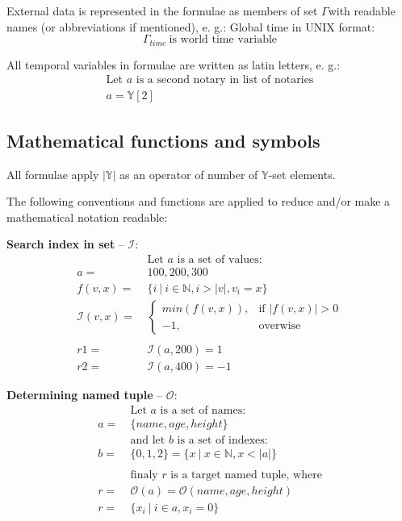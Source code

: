 \documentclass[12pt]{report}
\newcommand{\hlc}[1]{\colorbox{yellow!25}{#1}}
\begin{document}
External data is represented in the formulae as members of set $\Gamma$with readable names (or abbreviations if mentioned), e. g.: Global time in UNIX format:
\begin{equation}
\Gamma_{time} \ \text{is world time variable}
\end{equation}

All \hlc{temporal} variables in formulae are written as latin letters, e. g.:
\begin{equation}
\begin{aligned}
\text{Let } a \text{ is a second notary in list of notaries} \\
a = \mathbb{Y}[2]
\end{aligned}
\end{equation}

\subsection{Mathematical functions and symbols}
\label{tech-review-math}
All formulae apply $|\mathbb{Y}|$ as an operator of number of $\mathbb{Y}$-set elements.

The following conventions and functions are applied to reduce and/or make a mathematical notation readable:

\textbf{Search index in set} – $\mathcal{I}$:
\begin{align}
&\ \text{Let } a \text{ is a set of values: } \nonumber\\
a =&\ {100, 200, 300} \nonumber\\
f(v, x) =&\ \{i \ | \ i \in \mathbb{N},  i > |v|, v_i = x \} \\
\mathcal{I}(v, x) =&\ \begin{cases}
	min(f(v,x)), & \text{if } |f(v, x)| > 0 \\
	-1, & \text{overwise}
\end{cases}
\\
\\
r1 = &\ \mathcal{I}(a, 200) = 1\nonumber \\
r2 = &\ \mathcal{I}(a, 400) = -1
\end{align}

\textbf{\hlc{Determining} named tuple} – $\mathcal{O}$:
\begin{align}
&\ \text{Let } a \text{ is a set of names: } \nonumber\\
a =&\ \{name, age, height\} \nonumber\\
&\ \text{and let } b \text{ is a set of indexes: } \nonumber\\
b =&\ \{0, 1, 2\} = \{x \ | \ x \in \mathbb{N}, x < |a|\} \\
& \nonumber\\
&\ \text{finaly } r \text{ is a target named tuple, where} \nonumber\\
r =&\ \mathcal{O}(a) = \mathcal{O}(name, age, height) \\ 
r =&\ \{x_i \ | \ i \in  a, x_i = 0 \}
\end{align}
\end{document}
